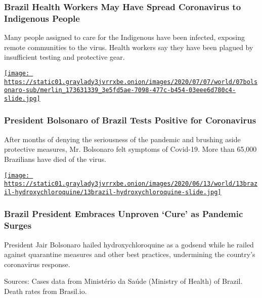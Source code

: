 \hypertarget{brazil-health-workers-may-have-spread-coronavirus-to-indigenous-people}{%
\subsubsection{Brazil Health Workers May Have Spread Coronavirus to
Indigenous
People}\label{brazil-health-workers-may-have-spread-coronavirus-to-indigenous-people}}

Many people assigned to care for the Indigenous have been infected,
exposing remote communities to the virus. Health workers say they have
been plagued by insufficient testing and protective gear.

\href{https://www.nytimes3xbfgragh.onion/2020/07/07/world/americas/brazil-bolsonaro-coronavirus.html}{\texttt{[image: https://static01.graylady3jvrrxbe.onion/images/2020/07/07/world/07bolsonaro-sub/merlin\_173631339\_3e5fd5ae-7098-477c-b454-03eee6d780c4-slide.jpg]}}

\hypertarget{president-bolsonaro-of-brazil-tests-positive-for-coronavirus}{%
\subsubsection{President Bolsonaro of Brazil Tests Positive for
Coronavirus}\label{president-bolsonaro-of-brazil-tests-positive-for-coronavirus}}

After months of denying the seriousness of the pandemic and brushing
aside protective measures, Mr. Bolsonaro felt symptoms of Covid-19. More
than 65,000 Brazilians have died of the virus.

\href{https://www.nytimes3xbfgragh.onion/2020/06/13/world/americas/virus-brazil-bolsonaro-chloroquine.html}{\texttt{[image: https://static01.graylady3jvrrxbe.onion/images/2020/06/13/world/13brazil-hydroxychloroquine/13brazil-hydroxychloroquine-slide.jpg]}}

\hypertarget{brazil-president-embraces-unproven-cure-as-pandemic-surges}{%
\subsubsection{Brazil President Embraces Unproven `Cure' as Pandemic
Surges}\label{brazil-president-embraces-unproven-cure-as-pandemic-surges}}

President Jair Bolsonaro hailed hydroxychloroquine as a godsend while he
railed against quarantine measures and other best practices, undermining
the country's coronavirus response.

Sources: Cases data from Ministério da Saúde (Ministry of Health) of
Brazil. Death rates from Brasil.io.

